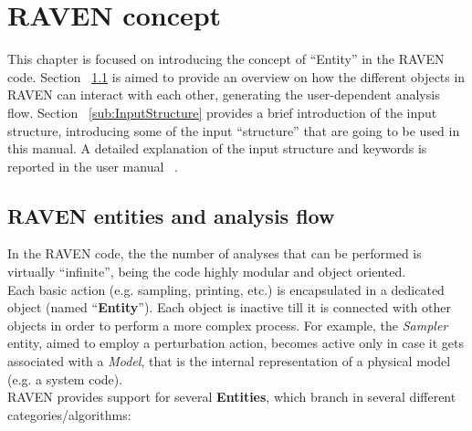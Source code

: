 \section{RAVEN concept}
\label{sec:RAVENconcept}
This chapter is focused on introducing the concept of ``Entity'' in the RAVEN code. 
Section ~\ref{sub:EntitiesAndFlow} is aimed to provide an overview on how the different objects in
RAVEN can interact with each other, generating the user-dependent analysis flow.
Section ~\ref{sub:InputStructure} provides a brief introduction of the input structure, introducing
some of the input ``structure'' that are going to be used in this manual. A detailed explanation of the
input structure and keywords is reported in the user manual ~\cite{RAVENuserManual}.
\subsection{RAVEN entities and analysis flow}
\label{sub:EntitiesAndFlow}
In the RAVEN code, the the number of analyses that can be performed is virtually ``infinite'',
being the code highly modular and object oriented. 
\\Each basic action (e.g. sampling, printing, etc.) is encapsulated in
a dedicated object (named ``\textbf{Entity}''). Each object is inactive till it is connected with 
other objects in order to perform a more complex process. For example,
the \textit{Sampler} entity, aimed to employ a perturbation action, becomes active only in case
it gets associated with a \textit{Model}, that is the internal representation of a physical model (e.g. a system code).
\\RAVEN provides support for several \textbf{Entities}, which branch in several different categories/algorithms:

